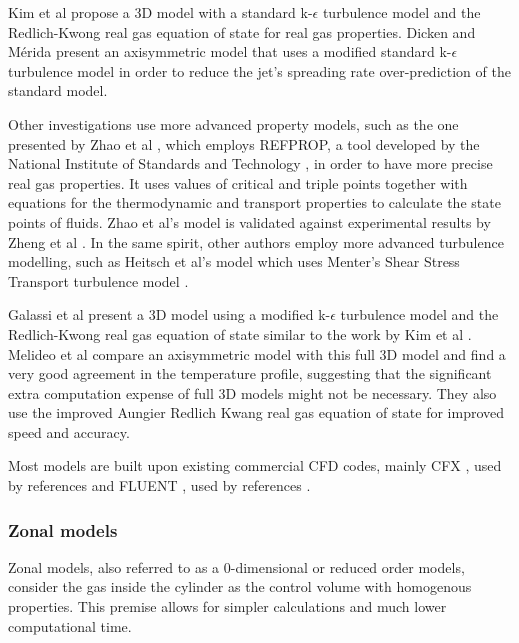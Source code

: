 Kim et al \cite{Kim2010} propose a 3D model with a standard  k-$\epsilon$ turbulence model \cite{Launder1974} and the Redlich-Kwong real gas equation of state \cite{Redlich1949} for real gas properties. Dicken and M\'erida \cite{Dicken2007a} present an axisymmetric model that uses a modified standard k-$\epsilon$ turbulence model in order to reduce the jet's spreading rate over-prediction of the standard model.

Other investigations use more advanced property models, such as the one presented by Zhao et al \cite{Zhao2012}, which employs REFPROP, a tool developed by the National Institute of Standards and Technology \cite{refprop}, in order to have more precise real gas properties. It uses values of critical and triple points together with equations for the thermodynamic and transport properties to calculate the state points of fluids.  Zhao et al's model is validated against experimental results by Zheng et al \cite{Zheng2013}. In the same spirit, other authors employ more advanced turbulence modelling, such as Heitsch et al's model \cite{Heitsch2011} which uses Menter's Shear Stress Transport turbulence model \cite{Menter1994}.

Galassi et al \cite{Galassi2012} present a 3D model using a modified  k-$\epsilon$ turbulence model and the Redlich-Kwong real gas equation of state similar to the work by Kim et al \cite{Kim2010}. Melideo et al \cite{Melideo2014} compare an axisymmetric model with this full 3D model and find a very good agreement in the temperature profile, suggesting that the significant extra computation expense of full 3D models might not be necessary. They also use the improved Aungier Redlich Kwang real gas equation of state \cite{Aungier1995} for improved speed and accuracy.

Most models are built upon existing commercial CFD codes, mainly CFX \cite{cfx}, used by references \cite{Galassi2012,Melideo2014,Heitsch2011} and FLUENT \cite{fluent}, used by references \cite{Zheng2013,Dicken2007a,Zhao2012,Kim2010}. 


\subsubsection{Zonal models}
\label{sec:zonalModels}


Zonal models, also referred to as a 0-dimensional or reduced order models, consider the gas inside the cylinder as the control volume with homogenous properties. This premise allows for simpler calculations and much lower computational time.


